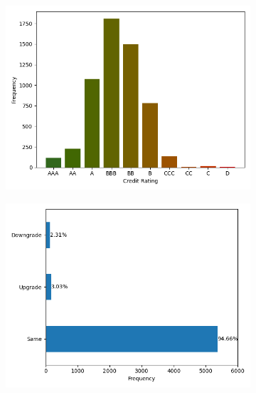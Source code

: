 \documentclass{article}[11pt]
\begin{document}
    \begin{figure}
        \caption{Credit Ratings}
        \begin{subfigure}[h]{0.4925\textwidth}
            \centering
            \includegraphics[width=0.95\hsize]{../Output/All Data EDA/Tabular EDA/Distribution of Rating Issuances_no_title.png}
        \end{subfigure}
        \begin{subfigure}[h]{0.4925\textwidth}
            \centering
            \includegraphics[width=0.95\hsize]{../Output/All Data EDA/Tabular EDA/Change_Short_no_title.png}
        \end{subfigure}
        \hfill
        \label{fig:credit-ratings}
    \end{figure}
\end{document}
